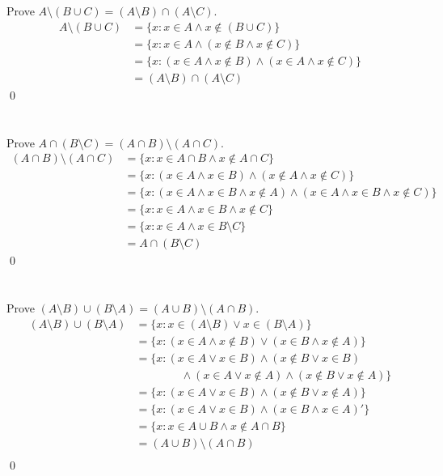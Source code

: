 \section{}\label{sec:14}

Prove $A \setminus (B \cup C) = (A \setminus B) \cap (A \setminus C)$.
\hr
\begin{align*}
    A \setminus (B \cup C) &= \{x : x \in A \land x \notin (B \cup C)\} \\
    &= \{x : x \in A \land (x \notin B \land x \notin C)\} \\
    &= \{x : (x \in A \land x \notin B) \land (x \in A \land x \notin C)\} \\
    &= (A \setminus B) \cap (A \setminus C)
\end{align*}\qed

\section{}\label{sec:15}

Prove $A \cap (B \setminus C) = (A \cap B) \setminus (A \cap C)$.
\hr
\begin{align*}
    (A \cap B) \setminus (A \cap C) &= \{x : x \in A \cap B \land x \notin A \cap C\} \\
    &= \{x : (x \in A \land x \in B) \land (x \notin A \land x \notin C)\} \\
    &= \{x : (x \in A \land x \in B \land x \notin A) \land (x \in A \land x \in B \land x \notin C)\} \\
    &= \{x : x \in A \land x \in B \land x \notin C\} \\
    &= \{x : x \in A \land x \in B \setminus C\} \\
    &= A \cap (B \setminus C)
\end{align*}\qed

\section{}\label{sec:16}

Prove $(A \setminus B) \cup (B \setminus A) = (A \cup B) \setminus (A \cap B)$.
\hr
\begin{align*}
    (A \setminus B) \cup (B \setminus A) &= \{x : x \in (A \setminus B) \lor x \in (B \setminus A)\} \\
    &= \{x : (x \in A \land x \notin B) \lor (x \in B \land x \notin A)\} \\
    &= \{x : (x \in A \lor x \in B) \land (x \notin B \lor x \in B) \\
    & \qquad \qquad \land (x \in A \lor x \notin A) \land (x \notin B \lor x \notin A)\} \\
    &= \{x : (x \in A \lor x \in B) \land (x \notin B \lor x \notin A)\} \\
    &= \{x : (x \in A \lor x \in B) \land (x \in B \land x \in A)'\} \\
    &= \{x : x \in A \cup B \land x \notin A \cap B\} \\
    &= (A \cup B) \setminus (A \cap B) \\
\end{align*}\qed
\pagebreak
